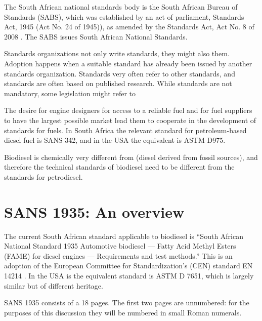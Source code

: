 The South African national standards body is the South African Bureau of
Standards (SABS), which was established by an act of parliament,
 Standards Act, 1945 (Act No. 24 of 1945)), as amended by the Standards Act, Act
 No. 8 of 2008 \autocite{Act8-2008}. The SABS issues South African National
 Standards.

Standards organizations not only write standards, they might also
 them. Adoption happens when a suitable standard has already been
issued by another standards organization. Standards very often refer to other
standards, and standards are often based on published research. While standards
are not mandatory, some legislation might refer to 

The desire for engine designers for access to a reliable fuel and for fuel
suppliers to have the largest possible market lead them to cooperate in the
development of standards for fuels. In South Africa the relevant standard for
petroleum-based diesel fuel is SANS 342, and in the USA the equivalent is ASTM
D975.

Biodiesel is chemically very different from  (diesel
derived from fossil sources), and therefore the technical standards of biodiesel
need to be different from the standards for petrodiesel.

\section{SANS 1935: An overview}

The current South African standard applicable to biodiesel is ``South African
National Standard 1935 Automotive biodiesel — Fatty Acid Methyl Esters (FAME)
for diesel engines — Requirements and test methods.'' \autocite{SANS1935} This
is an adoption of the European Committee for Standardization's (CEN) standard EN
14214 \autocite{EN14214}. In the USA is the equivalent standard is ASTM D 7651,
which is largely similar but of different heritage.

SANS 1935 consists of a 18 pages. The first two pages are unnumbered: for the
purposes of this discussion they will be numbered in small Roman numerals.

